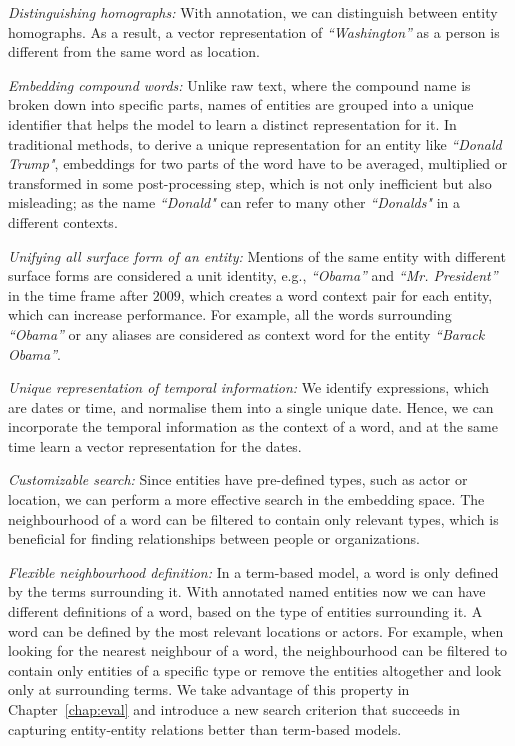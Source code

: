 \begin{compactitem}
\item \emph{Distinguishing homographs:} With annotation, we can distinguish between entity homographs. As a result, a vector representation of \emph{``Washington''} as a person is different from the same word as location. 
\item \emph{Embedding compound words:}  Unlike raw text, where the compound name is broken down into specific parts, names of entities are grouped into a unique identifier that helps the model to learn a distinct representation for it. In traditional methods, to derive a unique representation for an entity like \emph{``Donald Trump"}, embeddings for two parts of the word have to be averaged, multiplied or transformed in some post-processing step, which is not only inefficient but also misleading; as the name \emph{``Donald"} can refer to many other \emph{``Donalds"} in a different contexts. 
\item \emph{Unifying all surface form of an entity:} Mentions of the same entity with different surface forms are considered a unit identity, e.g., \emph{``Obama''} and \emph{``Mr. President''} in the time frame after $2009$, which creates a word context pair for each entity, which can increase performance. For example, all the words surrounding \emph{``Obama''} or any aliases are considered as context word for the entity \emph{``Barack Obama''}. 
\item \emph{Unique representation of temporal information:} We identify expressions, which are dates or time, and normalise them into a single unique date. Hence, we can incorporate the temporal information as the context of a word, and at the same time learn a vector representation for the dates.
\item \emph{Customizable search:} Since entities have pre-defined types, such as actor or location, we can perform a more effective search in the embedding space. The neighbourhood of a word can be filtered to contain only relevant types, which is beneficial for finding relationships between people or organizations. 
\item \emph{Flexible neighbourhood definition:} In a term-based model, a word is only defined by the terms surrounding it. With annotated named entities now we can have different definitions of a word, based on the type of entities surrounding it. A word can be defined by the most relevant locations or actors. For example, when looking for the nearest neighbour of a word, the neighbourhood can be filtered to contain only entities of a specific type or remove the entities altogether and look only at surrounding terms. We take advantage of this property in Chapter~\ref{chap:eval} and introduce a new search criterion that succeeds in capturing entity-entity relations better than term-based models.\\
\end{compactitem}
